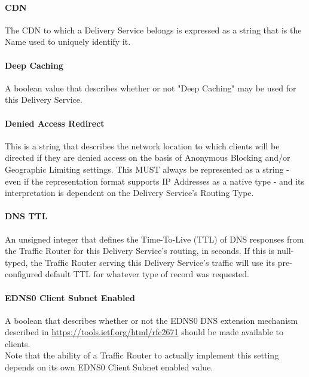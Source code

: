 \paragraph{CDN}
The CDN to which a Delivery Service belongs is expressed as a string that is the
Name used to uniquely identify it.


\paragraph{Deep Caching}
A boolean value that describes whether or not "Deep Caching" may be used for
this Delivery Service.

\paragraph{Denied Access Redirect}
This is a string that describes the network location to which clients will be
directed if they are denied access on the basis of Anonymous Blocking and/or
Geographic Limiting settings. This MUST always be represented as a string - even
if the representation format supports IP Addresses as a native type - and its
interpretation is dependent on the Delivery Service's Routing Type.

\paragraph{DNS TTL}
An unsigned integer that defines the Time-To-Live (TTL) of DNS responses from
the Traffic Router for this Delivery Service's routing, in seconds.
If this is null-typed, the Traffic Router serving this Delivery Service's
traffic will use its pre-configured default TTL for whatever type of record was
requested.

\paragraph{EDNS0 Client Subnet Enabled}
A boolean that describes whether or not the EDNS0 DNS extension mechanism
described in \href{RFC2671}{https://tools.ietf.org/html/rfc2671} should be made
available to clients.\\
Note that the ability of a Traffic Router to actually implement this setting
depends on its own EDNS0 Client Subnet enabled value.


